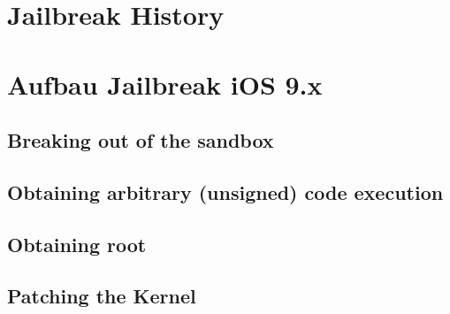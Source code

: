 


\section{Jailbreak History}
\label{sec:JBHistory}

\section{Aufbau Jailbreak iOS 9.x}
\label{sec:JBAufbau}

\cite{TaiG[1]}
\cite{TaiG[2]}
\cite{TaiG[3]}

\subsection{Breaking out of the sandbox}
\label{sec:JBStep1}

\subsection{Obtaining arbitrary (unsigned) code execution}
\label{sec:JBStep2}

\subsection{Obtaining root}
\label{sec:JBStep3}

\subsection{Patching the Kernel}
\label{sec:JBStep4}
